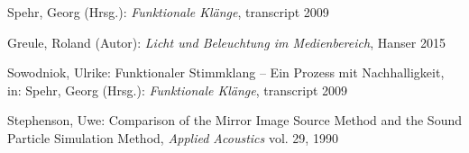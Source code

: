 \begin{thebibliography}{}
Spehr, Georg (Hrsg.): 
\emph{Funktionale Klänge}, transcript 2009

Greule, Roland (Autor):
\emph{Licht und Beleuchtung im Medienbereich}, Hanser 2015 


Sowodniok, Ulrike: 
\glqq Funktionaler Stimmklang -- Ein Prozess mit Nachhalligkeit\grqq, 
in: Spehr, Georg (Hrsg.): \emph{Funktionale Klänge}, transcript 2009




Stephenson, Uwe: 
\glqq Comparison of the Mirror Image Source Method and the Sound Particle Simulation Method\grqq, 
\emph{Applied Acoustics} vol. 29, 1990


\end{thebibliography}

\clearpage\thispagestyle{empty}
\eigen  %












